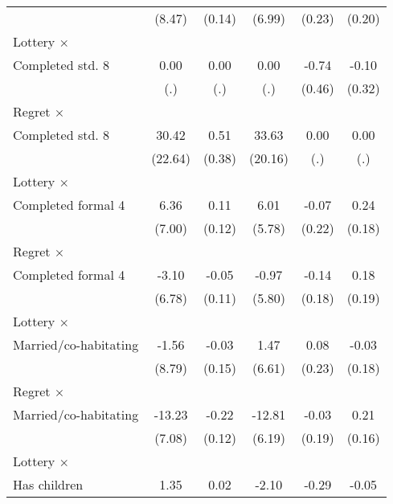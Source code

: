 \begin{table}[htbp]
\begin{tabular}{l*{5}{c}}
                &   (8.47)         &   (0.14)         &   (6.99)         &   (0.23)         &   (0.20)         \\
\addlinespace
Lottery $\times$ \\ Completed std. 8&     0.00         &     0.00         &     0.00         &    -0.74         &    -0.10         \\
                &      (.)         &      (.)         &      (.)         &   (0.46)         &   (0.32)         \\
\addlinespace
Regret $\times$ \\ Completed std. 8&    30.42         &     0.51         &    33.63\sym{*}  &     0.00         &     0.00         \\
                &  (22.64)         &   (0.38)         &  (20.16)         &      (.)         &      (.)         \\
\addlinespace
Lottery $\times$ \\ Completed formal 4&     6.36         &     0.11         &     6.01         &    -0.07         &     0.24         \\
                &   (7.00)         &   (0.12)         &   (5.78)         &   (0.22)         &   (0.18)         \\
\addlinespace
Regret $\times$ \\ Completed formal 4&    -3.10         &    -0.05         &    -0.97         &    -0.14         &     0.18         \\
                &   (6.78)         &   (0.11)         &   (5.80)         &   (0.18)         &   (0.19)         \\
\addlinespace
Lottery $\times$ \\ Married/co-habitating&    -1.56         &    -0.03         &     1.47         &     0.08         &    -0.03         \\
                &   (8.79)         &   (0.15)         &   (6.61)         &   (0.23)         &   (0.18)         \\
\addlinespace
Regret $\times$ \\ Married/co-habitating&   -13.23\sym{*}  &    -0.22\sym{*}  &   -12.81\sym{**} &    -0.03         &     0.21         \\
                &   (7.08)         &   (0.12)         &   (6.19)         &   (0.19)         &   (0.16)         \\
\addlinespace
Lottery $\times$ \\ Has children&     1.35         &     0.02         &    -2.10         &    -0.29         &    -0.05         \\

\end{tabular}
\end{table}
